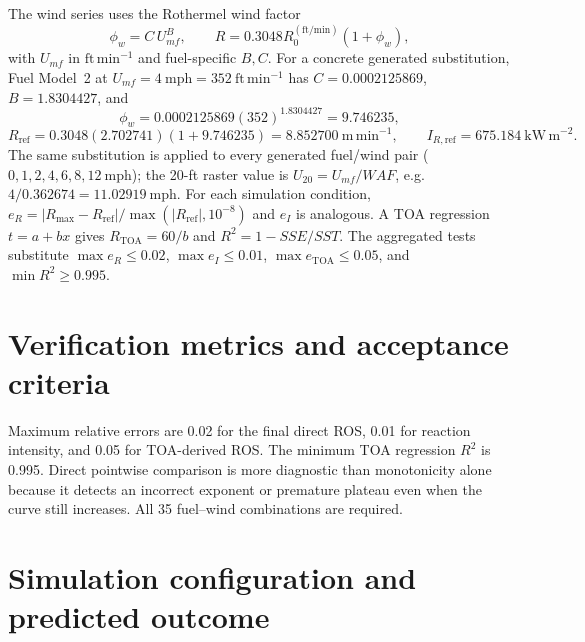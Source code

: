 The wind series uses the Rothermel wind factor
\[
 \phi_w=C\,U_{mf}^{B},\qquad R=0.3048R_0^{(\mathrm{ft/min})}(1+\phi_w),
\]
with \(U_{mf}\) in \(\mathrm{ft\,min^{-1}}\) and fuel-specific \(B,C\).
For a concrete generated substitution, Fuel Model~2 at
\(U_{mf}=4~\mathrm{mph}=352~\mathrm{ft\,min^{-1}}\) has
\(C=0.0002125869\), \(B=1.8304427\), and
\[
 \phi_w=0.0002125869(352)^{1.8304427}=9.746235,
\]
\[
 R_{\mathrm{ref}}=0.3048(2.702741)(1+9.746235)
 =8.852700~\mathrm{m\,min^{-1}},\qquad
 I_{R,\mathrm{ref}}=675.184~\mathrm{kW\,m^{-2}}.
\]
The same substitution is applied to every generated fuel/wind pair
(\(0,1,2,4,6,8,12~\mathrm{mph}\)); the 20-ft raster value is
\(U_{20}=U_{mf}/WAF\), e.g. \(4/0.362674=11.02919~\mathrm{mph}\).
For each simulation condition, \(e_R=|R_{\max}-R_{\mathrm{ref}}|/
\max(|R_{\mathrm{ref}}|,10^{-8})\) and \(e_I\) is analogous.
A TOA regression \(t=a+bx\) gives \(R_{\mathrm{TOA}}=60/b\) and
\(R^2=1-SSE/SST\).  The aggregated tests substitute
\(\max e_R\leq0.02\), \(\max e_I\leq0.01\),
\(\max e_{\mathrm{TOA}}\leq0.05\), and \(\min R^2\geq0.995\).

\section{Verification metrics and acceptance criteria}
Maximum relative errors are 0.02 for the final direct ROS, 0.01 for reaction intensity, and 0.05 for TOA-derived ROS.  The minimum TOA regression $R^2$ is 0.995.  Direct pointwise comparison is more diagnostic than monotonicity alone because it detects an incorrect exponent or premature plateau even when the curve still increases.  All 35 fuel--wind combinations are required.

\section{Simulation configuration and predicted outcome}

